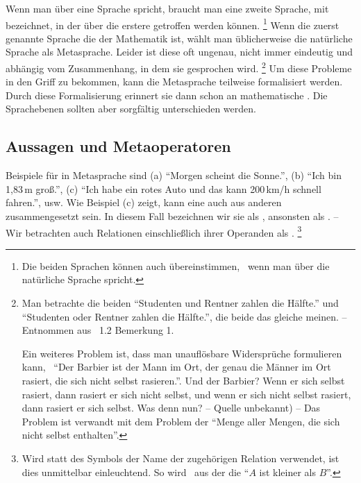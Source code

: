 Wenn man über eine Sprache spricht, braucht man eine zweite Sprache, mit \emph{} bezeichnet, in der  über die erstere getroffen werden können.%
\footnote{%
	Die beiden Sprachen können auch übereinstimmen, \textzB\ wenn man über die natürliche Sprache spricht.
}
Wenn die zuerst genannte Sprache die der Mathematik ist, wählt man üblicherweise die natürliche Sprache als Metasprache.
Leider ist diese oft ungenau, nicht immer eindeutig und abhängig vom Zusammenhang, in dem sie gesprochen wird.%
\footnote{%
	Man betrachte die beiden  \enquote{Studenten und Rentner zahlen die Hälfte.} und \enquote{Studenten oder Rentner zahlen die Hälfte.}, die beide das gleiche meinen.
	-- Entnommen aus \cite{bib:Rautenberg} \sectionname~1.2 Bemerkung 1.

	Ein weiteres Problem ist, dass man unauflösbare Widersprüche formulieren kann, \textzB\ \enquote{Der Barbier ist der Mann im Ort, der genau die Männer im Ort rasiert, die sich nicht selbst rasieren.}.
	Und der Barbier?
	Wenn er sich selbst rasiert, dann rasiert er sich nicht selbst, und wenn er sich nicht selbst rasiert, dann rasiert er sich selbst.
	Was denn nun?
	-- Quelle unbekannt) --
	Das Problem ist verwandt mit dem Problem der \enquote{Menge aller Mengen, die sich nicht selbst enthalten}.
}
Um diese Probleme in den Griff zu bekommen, kann die Metasprache teilweise formalisiert werden.
Durch diese Formalisierung erinnert sie dann schon an mathematische .
Die Sprachebenen sollten aber sorgfältig unterschieden werden.

\subsection{Aussagen und Metaoperatoren}%
\label{sub:Aussagen}

Beispiele für  in Metasprache sind
(a) \enquote{Morgen scheint die Sonne.},
(b) \enquote{Ich bin 1,83\,m groß.},
(c) \enquote{Ich habe ein rotes Auto und das kann 200\,km/h schnell fahren.}, usw.
Wie Beispiel (c) zeigt, kann eine  auch aus anderen  zusammengesetzt sein.
In diesem Fall bezeichnen wir sie als \emph{}, ansonsten als \emph{}.
-- Wir betrachten auch Relationen einschließlich ihrer Operanden als .%
\footnote{%
	Wird statt des Symbols der Name der zugehörigen Relation verwendet, ist dies unmittelbar einleuchtend.
	So wird \textzB\ aus der   die  \enquote{$A$ ist kleiner als $B$}.
}

